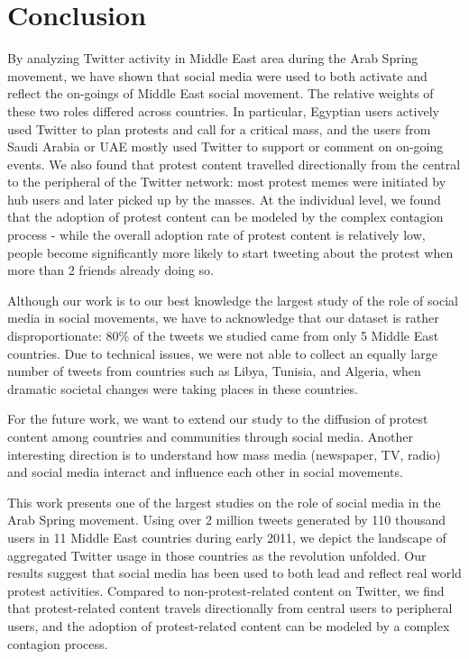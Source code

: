 \documentclass[phd,tocprelim]{cornell}
\begin{document}
\section{Conclusion}
By analyzing Twitter activity in Middle East area during the Arab Spring movement, we have shown that social media were used to both activate and reflect the on-goings of Middle East social movement. The relative weights of these two roles differed across countries. In particular, Egyptian users actively used Twitter to plan protests and call for a critical mass, and the users from Saudi Arabia or UAE mostly used Twitter to support or comment on on-going events. We also found that protest content travelled directionally from the central to the peripheral of the Twitter network:  most protest memes were initiated by hub users and later picked up by the masses.  At the individual level, we found that the adoption of protest content can be modeled by the complex contagion process - while the overall adoption rate of protest content is relatively low, people become significantly more likely to start tweeting about the protest when more than 2 friends already doing so. 

 Although our work is to our best knowledge the largest study of the role of social media in social movements, we have to acknowledge that our dataset is rather disproportionate: $80\%$ of the tweets we studied came from only 5 Middle East countries. Due to technical issues, we were not able to collect an equally large number of tweets from countries such as Libya, Tunisia, and Algeria, when dramatic societal changes were taking places in these countries.

For the future work, we want to extend our study to the diffusion of protest content among countries and communities through social media. Another interesting direction is to understand how mass media (newspaper, TV, radio) and social media interact and influence each other in social movements.

This work presents one of the largest studies on the role of social media in the Arab Spring movement. Using over 2 million tweets generated by 110 thousand users in 11 Middle East countries during early 2011, we depict the landscape of aggregated Twitter usage in those countries as the revolution unfolded. Our results suggest that social media has been used to both lead and reflect real world protest activities. Compared to non-protest-related content on Twitter, we find that protest-related content travels directionally from central users to peripheral users, and the adoption of protest-related content can be modeled by a complex contagion process. 
\end{document}
